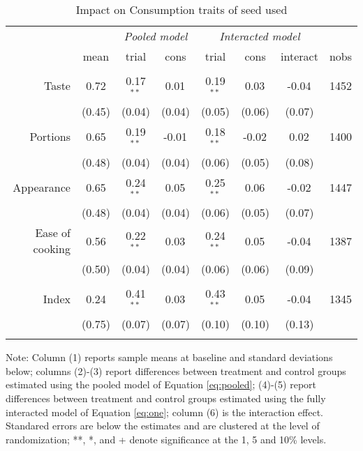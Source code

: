 \documentclass[english]{article}\usepackage[]{graphicx}\usepackage[]{xcolor}
\begin{document}
\begin{sidewaystable}
\caption{Impact on Consumption traits of seed used\label{cons_traits_used}}

\footnotesize
\begin{center}
\begin{tabular}{rccccccc}
\hline\hline
& & \multicolumn{2}{c}{\textit{Pooled model}} & \multicolumn{3}{c}{\textit{Interacted model}} \\
& mean & trial & cons & trial & cons & interact & nobs \\
\hline
\\
Taste
& 0.72
& 0.17$^{**}$
& 0.01$^{}$ 
& 0.19$^{**}$ 
& 0.03$^{}$
& -0.04$^{}$ & 1452 \\

& (0.45) & (0.04)  & (0.04) & (0.05)  & (0.06)  & (0.07)
 \\

Portions
& 0.65
& 0.19$^{**}$
& -0.01$^{}$ 
& 0.18$^{**}$ 
& -0.02$^{}$
& 0.02$^{}$ & 1400 \\

& (0.48) & (0.04)  & (0.04) & (0.06)  & (0.05)  & (0.08)
 \\

Appearance
& 0.65
& 0.24$^{**}$
& 0.05$^{}$ 
& 0.25$^{**}$ 
& 0.06$^{}$
& -0.02$^{}$ & 1447 \\

& (0.48) & (0.04)  & (0.04) & (0.06)  & (0.05)  & (0.07)
 \\

Ease of cooking
& 0.56
& 0.22$^{**}$
& 0.03$^{}$ 
& 0.24$^{**}$ 
& 0.05$^{}$
& -0.04$^{}$ & 1387 \\

& (0.50) & (0.04)  & (0.04) & (0.06)  & (0.06)  & (0.09)
 \\
\\
Index
& 0.24
& 0.41$^{**}$
& 0.03$^{}$ 
& 0.43$^{**}$ 
& 0.05$^{}$
& -0.04$^{}$ & 1345 \\

& (0.75) & (0.07)  & (0.07) & (0.10)  & (0.10)  & (0.13)
 \\

\\
\hline\hline
\end{tabular}
\end{center}
\scriptsize
Note: Column (1) reports sample means at baseline and standard deviations below;  columns (2)-(3) report differences between treatment and control groups estimated using the pooled model of Equation  \ref{eq:pooled}; (4)-(5) report differences between treatment and control groups estimated using the fully interacted model of Equation \ref{eq:one}; column (6) is the interaction effect. Standared errors are below the estimates and are clustered at the level of randomization; **, *, and + denote significance at the 1, 5 and 10\% levels.
\end{sidewaystable}
\end{document}
